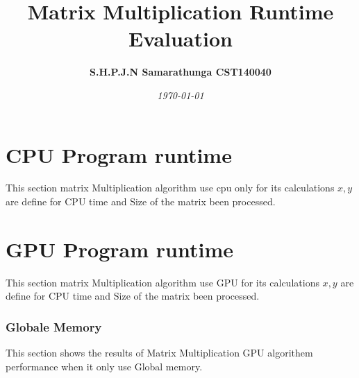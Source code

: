 \documentclass[12pt,oneside,a4paper]{article}
\title{\mytitle Matrix Multiplication Runtime Evaluation}
\date{\textit{\today}}
\author{\textbf {S.H.P.J.N Samarathunga CST140040}}
\begin{document}
\maketitle
{}
\newpage
\tableofcontents
{}
\newpage
{}

\section{CPU Program runtime}

	\par
	This section matrix Multiplication algorithm use cpu only for its calculations $x,y$ are define for CPU time and Size of the matrix been processed.
	\hfill \break
\begin{figure}[!h]
\end{figure}

\section{GPU Program runtime}

	\par
	This section matrix Multiplication algorithm use GPU for its calculations $x,y$ are define for CPU time and Size of the matrix been processed.
	\hfill \break

\subsubsection{Globale Memory}
	\par
	This section shows the results of Matrix Multiplication GPU algorithem performance when it only use Global memory.
	\hfill \break


\end{document}
